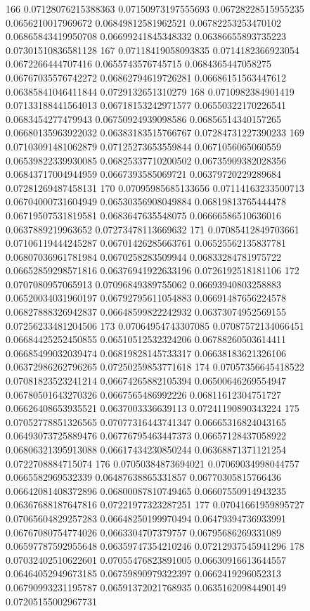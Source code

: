 166 0.07128076215388363 0.07150973197555693 0.06728228515955235 0.0656210017969672 0.06849812581962521 0.06782253253470102 0.06865843419950708 0.06699241845348332 0.06386655893735223 0.07301510836581128
167 0.07118419058093835 0.0714182366923054 0.0672266444707416 0.0655743576745715 0.0684365447058275 0.06767035576742272 0.06862794619726281 0.06686151563447612 0.06385841046411844 0.0729132651310279
168 0.0710982384901419 0.07133188441564013 0.06718153242971577 0.06550322170226541 0.0683454277479943 0.06750924939098586 0.06856514340157265 0.06680135963922032 0.06383183515766767 0.07284731227390233
169 0.07103091481062879 0.07125273653559844 0.0671056065060559 0.06539822339930085 0.06825337710200502 0.06735909382028356 0.06843717004944959 0.0667393585069721 0.06379720229289684 0.07281269487458131
170 0.07095985685133656 0.07114163233500713 0.06704000731604949 0.06530356908049884 0.06819813765444478 0.06719507531819581 0.0683647635548075 0.06666586510636016 0.0637889219963652 0.07273478113669632
171 0.07085412849703661 0.07106119444245287 0.06701426285663761 0.06525562135837781 0.06807036961781984 0.0670258283509944 0.06833284781975722 0.06652859298571816 0.06376941922633196 0.0726192518181106
172 0.0707080957065913 0.07096849389755062 0.06693940803258883 0.06520034031960197 0.06792795611054883 0.06691487656224578 0.06827888326942837 0.06648599822242932 0.06373074952569155 0.07256233481204506
173 0.07064954743307085 0.07087572134066451 0.06684425252450855 0.06510512532324206 0.06788260503614411 0.06685499032039474 0.06819828145733317 0.06638183621326106 0.06372986262796265 0.07250259853771618
174 0.07057356645418522 0.07081823523241214 0.06674265882105394 0.06500646269554947 0.06780501643270326 0.0667565486992226 0.06811612304751727 0.06626408653935521 0.0637003336639113 0.07241190890343224
175 0.07052778851326565 0.07077316443741347 0.06665316824043165 0.06493073725889476 0.06776795463447373 0.06657128437058922 0.06806321395913088 0.06617434230850244 0.06368871371121254 0.0722708884715074
176 0.07050384873694021 0.07069034998044757 0.0665582969532339 0.06487638865331857 0.06770305815766436 0.06642081408372896 0.06800087810749465 0.06607550914943235 0.06367688187647816 0.07221977323287251
177 0.07041661959895727 0.07065604829257283 0.06648250199970494 0.06479394736933991 0.06767080754774026 0.0663304707379757 0.06795686269331089 0.06597787592955648 0.06359747354210246 0.07212937545941296
178 0.07032402510622601 0.07055476823891005 0.06630916613644557 0.06464052949673185 0.06759890979322397 0.0662419296052313 0.06790993231195787 0.06591372021768935 0.06351620984490149 0.07205155002967731
